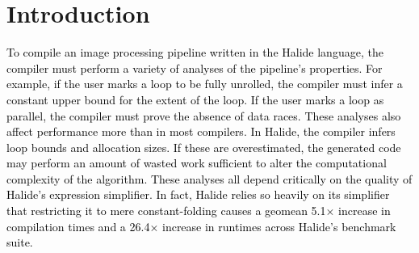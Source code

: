 \documentclass[acmsmall]{acmart}\settopmatter{}
\newcommand{\modified}[1]{\textcolor{black}{{#1}}}
\begin{document}




\maketitle


\section{Introduction}
\label{sec:introduction}
\modified{To compile an image processing pipeline written in the
  Halide language, the compiler must perform a variety of analyses of
  the pipeline's properties. For example, if the user marks a
  loop to be fully unrolled, the compiler must infer a constant upper
  bound for the extent of the loop. If the user marks
  a loop as parallel, the compiler must prove the absence of data
  races. These analyses also affect performance more than in most
  compilers. In Halide, the compiler infers loop bounds and allocation sizes.
  If these are overestimated, the generated code may
  perform an amount of wasted work sufficient to alter the
  computational complexity of the algorithm. These analyses all depend
  critically on the quality of Halide's expression simplifier. In
  fact, Halide relies so heavily on its simplifier that restricting it
  to mere constant-folding causes a geomean 5.1$\times$ increase in
  compilation times and a 26.4$\times$ increase in runtimes across
  Halide's benchmark suite.  }

\end{document}
